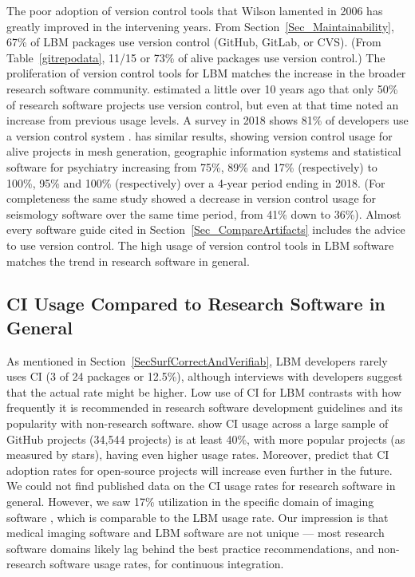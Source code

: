 \documentclass[final, 3p, times, authoryear]{elsarticle}
\begin{document}
The poor adoption of version control tools that Wilson lamented in 2006
\citep{Wilson2006} has greatly improved in the intervening years.  From
Section~\ref{Sec_Maintainability}, 67\% of LBM packages use version control
(GitHub, GitLab, or CVS).  (From Table~\ref{gitrepodata}, 11/15 or 73\% of alive
packages use version control.)  The proliferation of version control tools for
LBM matches the increase in the broader research software community.
\citet{Nguyen-HoanEtAl2010} estimated a little over 10 years ago that only 50\%
of research software projects use version control, but even at that time
\citet{Nguyen-HoanEtAl2010} noted an increase from previous usage levels. A
survey in 2018 shows 81\% of developers use a version control system
\citep{AlNoamanyAndBorghi2018}.  \citet{Smith2018} has similar results, showing
version control usage for alive projects in mesh generation, geographic
information systems and statistical software for psychiatry increasing from
75\%, 89\% and 17\% (respectively) to 100\%, 95\% and 100\% (respectively) over
a 4-year period ending in 2018.  (For completeness the same study showed a
decrease in version control usage for seismology software over the same time
period, from 41\% down to 36\%).  Almost every software guide cited in
Section~\ref{Sec_CompareArtifacts} includes the advice to use version control.
The high usage of version control tools in LBM software matches the trend in
research software in general.

\subsection{CI Usage Compared to Research Software in General}

As mentioned in Section~\ref{SecSurfCorrectAndVerifiab}, LBM developers rarely
uses CI (3 of 24 packages or 12.5\%), although interviews with developers
suggest that the actual rate might be higher. Low use of CI for LBM contrasts
with how frequently it is recommended in research software development
guidelines
\citep{BrettEtAl2021, Brown2015, ThielEtAl2020, Zadka2018, vanGompelEtAl2016}
and its popularity with non-research software. \citet{HiltonEtAl2016} show CI
usage across a large sample of GitHub projects (34,544 projects) is at least
40\%, with more popular projects (as measured by stars), having even higher
usage rates. Moreover, \citet{HiltonEtAl2016} predict that CI adoption rates for
open-source projects will increase even further in the future.  We could not
find published data on the CI usage rates for research software in general.
However, we saw 17\% utilization in the specific domain of imaging software
\citep{Dong2021}, which is comparable to the LBM usage rate. Our impression is
that medical imaging software and LBM software are not unique --- most research
software domains likely lag behind the best practice recommendations, and
non-research software usage rates, for continuous integration.
\end{document}
